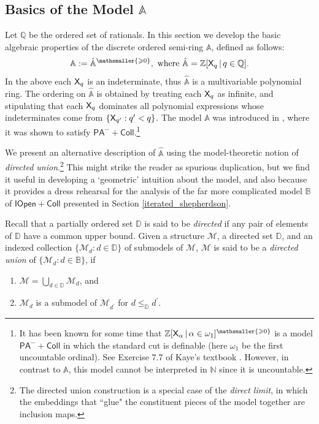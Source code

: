\documentclass{amsart}
\renewcommand{\leq}{\leqslant}
\renewcommand{\geq}{\geqslant}
\newcommand{\X}{{\sf X}}
\begin{document}
\subsection{Basics of the Model $\mathbb A$} 
Let $\mathbb{Q}$ be the ordered set of rationals. In this section we develop the basic algebraic properties of the discrete ordered semi-ring $\mathbb A$, defined as follows: $$\mathbb A :={\hat{\mathbb{A}}}^{\mathsmaller{\geq 0}},~\textrm{where~}\hat{\mathbb{A}}=
\mathbb Z[\X_q\mathop\mid q\in \mathbb Q].$$ In the above each $\X_q$ is an indeterminate, thus $\hat{\mathbb{A}}$ is a multivariable polynomial ring. 
The ordering on $\hat{\mathbb{A}}$ is obtained by treating each $\X_q$ as infinite, and stipulating that each $\X_q$ dominates all polynomial 
expressions whose indeterminates come from $\{\X_{q'}: q'<q\}$.  The model $\mathbb A$ was introduced in \cite{enlel:cat24}, where it was 
shown to satisfy $\mathsf{PA^-+Coll}.$\footnote{It has been known for some time that 
$\mathbb{Z}[\X_{\alpha}\mathop\mid \alpha\in \omega_1]^{\mathsmaller{\geq 0}}$ is a model $\mathsf{PA^-+Coll}$ in 
which the standard cut is definable (here $\omega_1$ be the first uncountable ordinal). See Exercise 7.7 of Kaye's 
textbook \cite[Chapter 7.2]{kaye:mode91}. However, in contrast to $\mathbb{A}$, this model cannot be interpreted in $\mathbb{N}$ since it is uncountable.} 

We present an alternative description of $\hat{\mathbb{A}}$ using the model-theoretic notion of \emph{directed union}.\footnote{The directed union construction is a special 
case of the \emph{direct limit}, in which the embeddings that ``glue" the constituent pieces of the model together are inclusion maps.} 
This might strike the reader as spurious duplication, but we 
find it useful in developing a `geometric' intuition about the model, and also because it 
provides a dress rehearsal for the analysis of the far more complicated model $\mathbb{B}$ of $\mathsf{IOpen+Coll}$ presented in Section \ref{iterated_shepherdson}.
 
 Recall that a partially ordered set $\mathbb{D}$ is said to be \emph{directed} if any pair of elements of $\mathbb{D}$ have a common upper bound. Given a structure $\mathcal{M}$, a directed set $\mathbb{D}$, and an indexed collection $\{\mathcal{M}_d: d\in \mathbb{D}\}$ of submodels of $\mathcal{M}$, $\mathcal{M}$ is said to be a \emph{directed union} of $\{\mathcal{M}_d: d\in \mathbb{B}\}$, if 
 \begin{enumerate}[$1$.]
 \item $\mathcal{M=}\bigcup\limits_{d\in \mathbb{D}}\mathcal{M}_{d}$, and
 \item $\mathcal{M}_{d}$
is a submodel of $\mathcal{M}_{d^{\prime }}$ for $d\leq _{\mathbb{D}}d^{\prime }.$ 
\end{enumerate}
\end{document}
